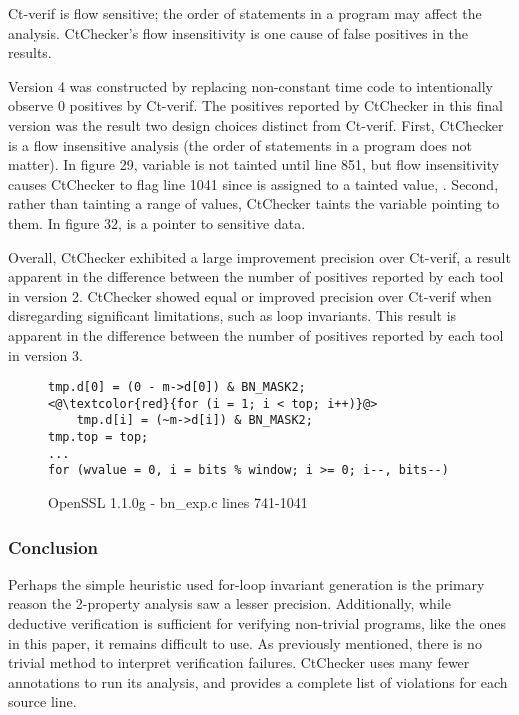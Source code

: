 Ct-verif is flow sensitive; the order of statements in a program may
affect the analysis.  CtChecker's flow insensitivity is one cause of
false positives in the results.

Version 4 was constructed by replacing non-constant time code to
intentionally observe 0 positives by Ct-verif. The positives reported
by CtChecker in this final version was the result two design choices
distinct from Ct-verif. First, CtChecker is a flow insensitive analysis
(the order of statements in a program does not matter). In figure 29,
variable  is not tainted until line 851, but flow
insensitivity causes CtChecker to flag line 1041 since  is
assigned to a tainted value, . Second, rather than
tainting a range of values, CtChecker taints the variable pointing to
them. In figure 32,  is a pointer to sensitive data.

Overall, CtChecker exhibited a large improvement precision over
Ct-verif, a result apparent in the difference between the number of
positives reported by each tool in version 2. CtChecker showed equal
or improved precision over Ct-verif when disregarding significant
limitations, such as loop invariants. This result is apparent in the
difference between the number of positives reported by each tool in
version 3.

\begin{figure}[h!]
\begin{lstlisting}
tmp.d[0] = (0 - m->d[0]) & BN_MASK2;
<@\textcolor{red}{for (i = 1; i < top; i++)}@>
    tmp.d[i] = (~m->d[i]) & BN_MASK2;
tmp.top = top;
...
for (wvalue = 0, i = bits % window; i >= 0; i--, bits--)
\end{lstlisting}
\caption{OpenSSL 1.1.0g - bn\_exp.c lines 741-1041}
\label{code:libgcrypt_normalize}
\end{figure}

\subsubsection{Conclusion}
Perhaps the simple heuristic used for-loop invariant generation is the
primary reason the 2-property analysis saw a lesser precision.  Additionally,
while deductive verification is sufficient for verifying non-trivial programs, like
the ones in this paper, it remains difficult to use. As previously mentioned,
there is no trivial method to interpret verification failures. CtChecker uses
many fewer annotations to run its analysis, and provides a complete list of
violations for each source line.

